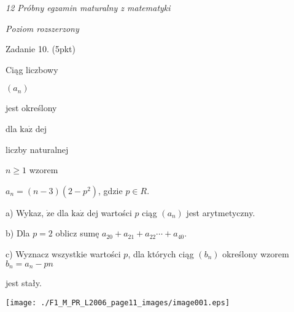 \documentclass[a4paper,12pt]{article}
\begin{document}
{\it 12 Próbny egzamin maturalny z matematyki}

{\it Poziom rozszerzony}

Zadanie 10. (5pkt)

Ciąg liczbowy

$(a_{n})$

jest określony

dla $\mathrm{k}\mathrm{a}\dot{\mathrm{z}}$ dej

liczby naturalnej

$n\geq 1$ wzorem

$a_{n}=(n-3)(2-p^{2})$, gdzie $p\in R.$

a) Wykaz, $\dot{\mathrm{z}}\mathrm{e}$ dla $\mathrm{k}\mathrm{a}\dot{\mathrm{z}}$ dej wartości $p$ ciąg $(a_{n})$ jest arytmetyczny.

b) Dla $p=2$ oblicz sumę $a_{20}+a_{21}+a_{22}\cdots+a_{40}.$

c) Wyznacz wszystkie wartości $p$, dla których ciąg $(b_{n})$ określony wzorem $b_{n}=a_{n}-pn$

jest stały.
\begin{center}
\texttt{[image: ./F1\_M\_PR\_L2006\_page11\_images/image001.eps]}
\end{center}
\end{document}
